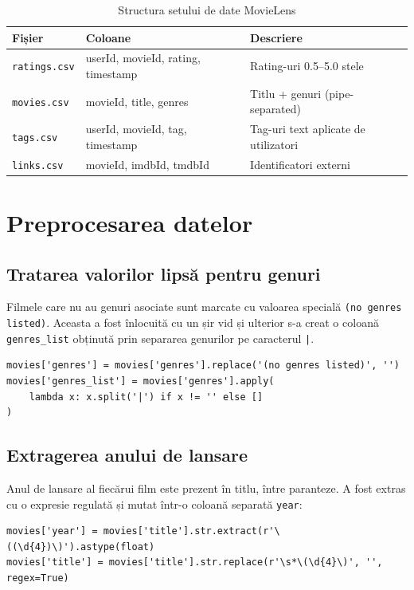 \documentclass[12pt,a4paper]{article}
\begin{document}
\begin{table}[H]
\centering
\begin{tabular}{lll}
\toprule
\textbf{Fișier} & \textbf{Coloane} & \textbf{Descriere} \\
\midrule
\texttt{ratings.csv} & userId, movieId, rating, timestamp & Rating-uri 0.5--5.0 stele \\
\texttt{movies.csv} & movieId, title, genres & Titlu + genuri (pipe-separated) \\
\texttt{tags.csv} & userId, movieId, tag, timestamp & Tag-uri text aplicate de utilizatori \\
\texttt{links.csv} & movieId, imdbId, tmdbId & Identificatori externi \\
\bottomrule
\end{tabular}
\caption{Structura setului de date MovieLens}
\end{table}

\section{Preprocesarea datelor}

\subsection{Tratarea valorilor lipsă pentru genuri}

Filmele care nu au genuri asociate sunt marcate cu valoarea specială \texttt{(no genres listed)}. Aceasta a fost înlocuită cu un șir vid și ulterior s-a creat o coloană \texttt{genres\_list} obținută prin separarea genurilor pe caracterul \texttt{|}.

\begin{lstlisting}
movies['genres'] = movies['genres'].replace('(no genres listed)', '')
movies['genres_list'] = movies['genres'].apply(
    lambda x: x.split('|') if x != '' else []
)
\end{lstlisting}

\subsection{Extragerea anului de lansare}

Anul de lansare al fiecărui film este prezent în titlu, între paranteze. A fost extras cu o expresie regulată și mutat într-o coloană separată \texttt{year}:

\begin{lstlisting}
movies['year'] = movies['title'].str.extract(r'\((\d{4})\)').astype(float)
movies['title'] = movies['title'].str.replace(r'\s*\(\d{4}\)', '', regex=True)
\end{lstlisting}
\end{document}
